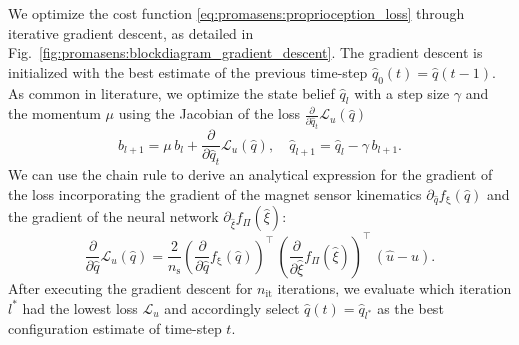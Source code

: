 
We optimize the cost function \eqref{eq:promasens:proprioception_loss} through iterative gradient descent, as detailed in Fig.~\ref{fig:promasens:blockdiagram_gradient_descent}. The gradient descent is initialized with the best estimate of the previous time-step $\hat{q}_0 (t) = \hat{q}(t-1)$.
As common in literature, we optimize the state belief $\hat{q}_l$ with a step size $\gamma$ and the momentum $\mu$ using the Jacobian of the loss $\frac{\partial}{\partial \hat{q}_t} \mathcal{L}_{u}(\hat{q})$
\begin{equation}\label{eq:promasens:gradient_descent}
    b_{l+1} = \mu \, b_l + \frac{\partial}{\partial \hat{q}_t} \mathcal{L}_{u}(\hat{q}), \quad \hat{q}_{l+1} = \hat{q}_l - \gamma \, b_{l+1}.
\end{equation}
We can use the chain rule to derive an analytical expression for the gradient of the loss incorporating the gradient of the magnet sensor kinematics $\partial_{\hat{q}} f_{\mathrm{\xi}}(\hat{q})$ and the gradient of the neural network $\partial_{\hat{\xi}} f_\Pi (\hat{\xi})$:
\begin{equation}
    \frac{\partial}{\partial \hat{q}} \mathcal{L}_{u}(\hat{q}) = \frac{2}{n_\mathrm{s}} \left ( \frac{\partial }{\partial {\hat{q}}} f_{\mathrm{\xi}}(\hat{q}) \right )^\top \, \left ( \frac{\partial}{\partial {\hat{\xi}}} f_\Pi(\hat{\xi}) \right )^\top \, (\hat{u} - u).
\end{equation}
After executing the gradient descent for $n_\mathrm{it}$ iterations, we evaluate which iteration $l^*$ had the lowest loss $\mathcal{L}_{u}$ and accordingly select $\hat{q}(t) = \hat{q}_{l^*}$ as the best configuration estimate of time-step $t$.
